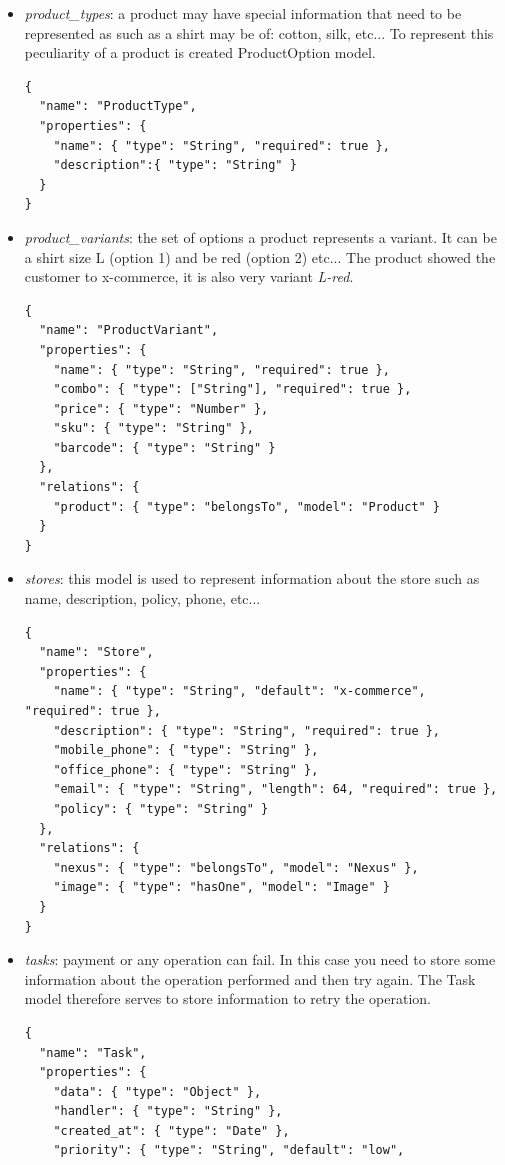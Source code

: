\begin{itemize}
\begin{lstlisting}
  }
}
\end{lstlisting}
\item \emph{product\_types}: a product may have special information that need to be represented as such as a shirt may be of: cotton, silk, etc...
To represent this peculiarity of a product is created ProductOption model.
\begin{lstlisting}
{
  "name": "ProductType",
  "properties": {
    "name": { "type": "String", "required": true },
    "description":{ "type": "String" }
  }
}
\end{lstlisting}
\item \emph{product\_variants}: the set of options a product represents a variant. It can be a shirt size L (option 1) and be red (option 2) etc...
The product showed the customer to x-commerce, it is also very variant \emph{L-red}.
\begin{lstlisting}
{
  "name": "ProductVariant",
  "properties": {
    "name": { "type": "String", "required": true },
    "combo": { "type": ["String"], "required": true },
    "price": { "type": "Number" },
    "sku": { "type": "String" },
    "barcode": { "type": "String" }
  },
  "relations": {
    "product": { "type": "belongsTo", "model": "Product" }
  }
}
\end{lstlisting}
\item \emph{stores}: this model is used to represent information about the store such as name, description, policy, phone, etc...
\begin{lstlisting}
{
  "name": "Store",
  "properties": {
    "name": { "type": "String", "default": "x-commerce", "required": true },
    "description": { "type": "String", "required": true },
    "mobile_phone": { "type": "String" },
    "office_phone": { "type": "String" },
    "email": { "type": "String", "length": 64, "required": true },
    "policy": { "type": "String" }
  },
  "relations": {
    "nexus": { "type": "belongsTo", "model": "Nexus" },
    "image": { "type": "hasOne", "model": "Image" }
  }
}
\end{lstlisting}
\item \emph{tasks}: payment or any operation can fail. In this case you need to store some information about the operation performed and then try again. The Task model therefore serves to store information to retry the operation.
\begin{lstlisting}
{
  "name": "Task",
  "properties": {
    "data": { "type": "Object" },
    "handler": { "type": "String" },
    "created_at": { "type": "Date" },
    "priority": { "type": "String", "default": "low",

\end{lstlisting}
\end{itemize}

